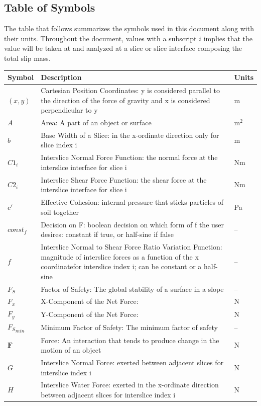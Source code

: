 \documentclass[12pt]{article}
\begin{document}
\subsection{Table of Symbols}
\label{Sec:ToS}
The table that follows summarizes the symbols used in this document along with their units. Throughout the document, values with a subscript $i$ implies that the value will be taken at and analyzed at a slice or slice interface composing the total slip mass.
\begin{longtabu}{l X[l] l}
\toprule
Symbol & Description & Units
\\
\midrule
\endhead
$(x,y)$ & Cartesian Position Coordinates: y is considered parallel to the direction of the force of gravity and x is considered perpendicular to y & m
\\
$A$ & Area: A part of an object or surface & $\text{m}^{2}$
\\
$b$ & Base Width of a Slice: in the x-ordinate direction only for slice index i & m
\\
${C1_{i}}$ & Interslice Normal Force Function: the normal force at the interslice interface for slice i & Nm
\\
${C2_{i}}$ & Interslice Shear Force Function: the shear force at the interslice interface for slice i & Nm
\\
$c'$ & Effective Cohesion: internal pressure that sticks particles of soil together & Pa
\\
$const_f$ & Decision on F: boolean decision on which form of f the user desires: constant if true, or half-sine if false & --
\\
$f$ & Interslice Normal to Shear Force Ratio Variation Function: magnitude of interslice forces as a function of the x coordinatefor interslice index i; can be constant or a half-sine & --
\\
${F_{S}}$ & Factor of Safety: The global stability of a surface in a slope & --
\\
${F_{x}}$ & X-Component of the Net Force:  & N
\\
${F_{y}}$ & Y-Component of the Net Force:  & N
\\
${{F_{S}}_{min}}$ & Minimum Factor of Safety: The minimum factor of safety & --
\\
$\mathbf{F}$ & Force: An interaction that tends to produce change in the motion of an object & N
\\
$G$ & Interslice Normal Force: exerted between adjacent slices for interslice index i & N
\\
$H$ & Interslice Water Force: exerted in the x-ordinate direction between adjacent slices for interslice index i & N

\end{longtabu}
\end{document}
